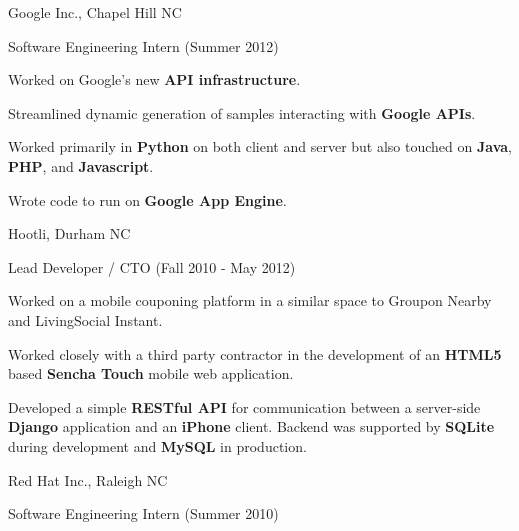 \documentclass[11pt]{article}
\begin{document}
        \begin{itemz}
            \item Google Inc., Chapel Hill NC
                \begin{itemz}[-]
                    \item Software Engineering Intern (Summer 2012)
                        \begin{itemz}[*]
                            \item Worked on Google's new {\bf API infrastructure}.
                            \item Streamlined dynamic generation of samples interacting with {\bf Google APIs}.
                            \item Worked primarily in {\bf Python} on both client and server but also touched on {\bf Java}, {\bf PHP}, and {\bf Javascript}.
                            \item Wrote code to run on {\bf Google App Engine}.
                        \end{itemz}
                \end{itemz}
            \item Hootli, Durham NC
                \begin{itemz}[-]
                    \item Lead Developer / CTO (Fall 2010 - May 2012)
                        \begin{itemz}[*]
                            \item Worked on a mobile couponing platform in a similar space to Groupon Nearby and LivingSocial Instant.
                            \item Worked closely with a third party contractor in the development of an {\bf HTML5} based {\bf Sencha Touch} mobile web application.
                            \item Developed a simple {\bf RESTful API} for communication between a server-side {\bf Django} application and an {\bf iPhone} client. Backend was supported by {\bf SQLite} during development and {\bf MySQL} in production.
                        \end{itemz}
                \end{itemz}
            \item Red Hat Inc., Raleigh NC
                \begin{itemz}[-]
                    \item Software Engineering Intern (Summer 2010)
                        \begin{itemz}[*]

\end{itemz}
\end{itemz}
\end{itemz}
\end{document}
